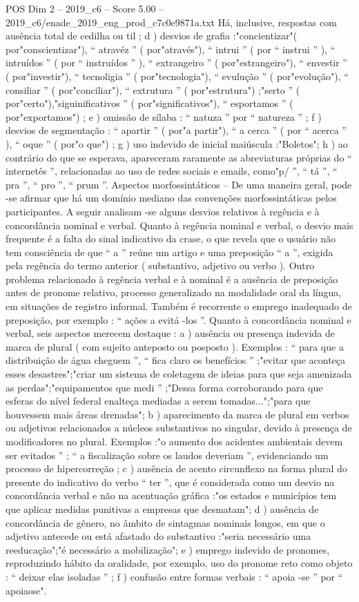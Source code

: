 \begin{textsample}{POS Dim 2 – 2019\_c6 – Score 5.00 – 2019\_c6/enade\_2019\_eng\_prod\_c7c0e9871a.txt}
Há, inclusive, respostas com ausência total de cedilha ou til ; d ) desvios de grafia :"concientizar"( por"conscientizar"), “ atravéz ” ( por"através"), “ intrui ” ( por “ instrui ” ), “ intruídos ” ( por “ instruídos ” ), “ extrangeiro ” ( por"estrangeiro"), “ envestir ” ( por"investir"), “ tecnoligia ” ( por"tecnologia"), “ evulução ” ( por"evolução"), “ consiliar ” ( por"conciliar"), “ extrutura ” ( por"estrutura") ;"serto ” ( por"certo"),"siguinificativos ” ( por"significativos"), “ esportamos ” ( por"exportamos") ; e ) omissão de sílaba : “ natuza ” por “ natureza ” ; f ) desvios de segmentação : “ apartir ” ( por"a partir"), “ a cerca ” ( por “ acerca ” ), “ oque ” ( por"o que") ; g ) uso indevido de inicial maiúscula :"Boletos"; h ) ao contrário do que se esperava, apareceram raramente as abreviaturas próprias do “ internetês ”, relacionadas ao uso de redes sociais e emails, como"p/ ”, “ tá ”, “ pra ”, “ pro ”, “ prum ”.
Aspectos morfossintáticos – De uma maneira geral, pode -se afirmar que há um domínio mediano das convenções morfossintáticas pelos participantes.
A seguir analisam -se alguns desvios relativos à regência e à concordância nominal e verbal.
Quanto à regência nominal e verbal, o desvio mais frequente é a falta do sinal indicativo da crase, o que revela que o usuário não tem consciência de que “ a ” reúne um artigo e uma preposição “ a ”, exigida pela regência do termo anterior ( substantivo, adjetivo ou verbo ).
Outro problema relacionado à regência verbal e à nominal é a ausência de preposição antes de pronome relativo, processo generalizado na modalidade oral da língua, em situações de registro informal.
Também é recorrente o emprego inadequado de preposição, por exemplo : “ ações a evitá -los ”.
Quanto à concordância nominal e verbal, seis aspectos merecem destaque : a ) ausência ou presença indevida de marca de plural ( com sujeito anteposto ou posposto ).
Exemplos : “ para que a distribuição de água cheguem ”, “ fica claro os benefícios ” ;"evitar que aconteça esses desastres";"criar um sistema de coletagem de ideias para que seja amenizada as perdas";"equipamentos que medi ” ;"Dessa forma corroborando para que esferas do nível federal enalteça mediadas a serem tomadas...";"para que houvessem mais áreas drenadas"; b ) aparecimento da marca de plural em verbos ou adjetivos relacionados a núcleos substantivos no singular, devido à presença de modificadores no plural.
Exemplos :"o aumento dos acidentes ambientais devem ser evitados ” ; “ a fiscalização sobre os laudos deveriam ”, evidenciando um processo de hipercorreção ; c ) ausência de acento circunflexo na forma plural do presente do indicativo do verbo “ ter ”, que é considerada como um desvio na concordância verbal e não na acentuação gráfica :"os estados e municípios tem que aplicar medidas punitivas a empresas que desmatam"; d ) ausência de concordância de gênero, no âmbito de sintagmas nominais longos, em que o adjetivo antecede ou está afastado do substantivo :"seria necessário uma reeducação";"é necessário a mobilização"; e ) emprego indevido de pronomes, reproduzindo hábito da oralidade, por exemplo, uso do pronome reto como objeto : “ deixar elas isoladas ” ; f ) confusão entre formas verbais : “ apoia -se ” por “ apoiasse".

\end{textsample}
